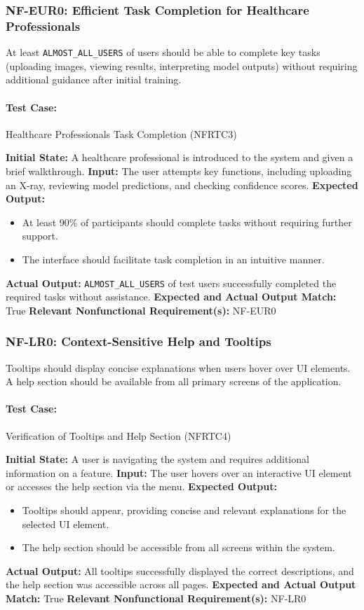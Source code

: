 \documentclass[12pt, titlepage]{article}
\begin{document}
\subsubsection{NF-EUR0: Efficient Task Completion for Healthcare Professionals}
At least \verb|ALMOST_ALL_USERS| of users should be able to complete key tasks (uploading images, viewing results, interpreting model outputs) without requiring additional guidance after initial training.

\paragraph{Test Case:} Healthcare Professionals Task Completion (NFRTC3)

\textbf{Initial State:} A healthcare professional is introduced to the system and given a brief walkthrough.  
\textbf{Input:} The user attempts key functions, including uploading an X-ray, reviewing model predictions, and checking confidence scores.  
\textbf{Expected Output:}
\begin{itemize}
    \item At least 90\% of participants should complete tasks without requiring further support.
    \item The interface should facilitate task completion in an intuitive manner.
\end{itemize}
\textbf{Actual Output:} \verb|ALMOST_ALL_USERS| of test users successfully completed the required tasks without assistance.  
\textbf{Expected and Actual Output Match:} True  
\textbf{Relevant Nonfunctional Requirement(s):} NF-EUR0  

\subsubsection{NF-LR0: Context-Sensitive Help and Tooltips}
Tooltips should display concise explanations when users hover over UI elements.  
A help section should be available from all primary screens of the application.

\paragraph{Test Case:} Verification of Tooltips and Help Section (NFRTC4)

\textbf{Initial State:} A user is navigating the system and requires additional information on a feature.  
\textbf{Input:} The user hovers over an interactive UI element or accesses the help section via the menu.  
\textbf{Expected Output:}
\begin{itemize}
    \item Tooltips should appear, providing concise and relevant explanations for the selected UI element.
    \item The help section should be accessible from all screens within the system.
\end{itemize}
\textbf{Actual Output:} All tooltips successfully displayed the correct descriptions, and the help section was accessible across all pages.  
\textbf{Expected and Actual Output Match:} True  
\textbf{Relevant Nonfunctional Requirement(s):} NF-LR0  
\end{document}
